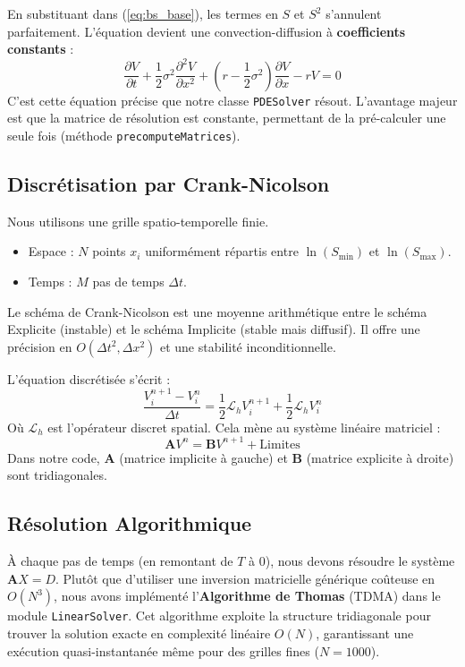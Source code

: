 \documentclass[a4paper,12pt]{article}
\begin{document}
En substituant dans (\ref{eq:bs_base}), les termes en $S$ et $S^2$ s'annulent parfaitement. L'équation devient une convection-diffusion à \textbf{coefficients constants} :
\begin{equation}
    \frac{\partial V}{\partial t} + \frac{1}{2}\sigma^2 \frac{\partial^2 V}{\partial x^2} + \left(r - \frac{1}{2}\sigma^2\right) \frac{\partial V}{\partial x} - rV = 0
    \label{eq:bs_log}
\end{equation}
C'est cette équation précise que notre classe \texttt{PDESolver} résout. L'avantage majeur est que la matrice de résolution est constante, permettant de la pré-calculer une seule fois (méthode \texttt{precomputeMatrices}).

\subsection{Discrétisation par Crank-Nicolson}
Nous utilisons une grille spatio-temporelle finie.
\begin{itemize}
    \item Espace : $N$ points $x_i$ uniformément répartis entre $\ln(S_{\min})$ et $\ln(S_{\max})$.
    \item Temps : $M$ pas de temps $\Delta t$.
\end{itemize}

Le schéma de Crank-Nicolson est une moyenne arithmétique entre le schéma Explicite (instable) et le schéma Implicite (stable mais diffusif). Il offre une précision en $O(\Delta t^2, \Delta x^2)$ et une stabilité inconditionnelle.

L'équation discrétisée s'écrit :
\begin{equation}
    \frac{V_i^{n+1} - V_i^n}{\Delta t} = \frac{1}{2} \mathcal{L}_h V_i^{n+1} + \frac{1}{2} \mathcal{L}_h V_i^n
\end{equation}
Où $\mathcal{L}_h$ est l'opérateur discret spatial. Cela mène au système linéaire matriciel :
\begin{equation}
    \mathbf{A} V^n = \mathbf{B} V^{n+1} + \text{Limites}
\end{equation}
Dans notre code, $\mathbf{A}$ (matrice implicite à gauche) et $\mathbf{B}$ (matrice explicite à droite) sont tridiagonales.

\subsection{Résolution Algorithmique}
À chaque pas de temps (en remontant de $T$ à $0$), nous devons résoudre le système $\mathbf{A} X = D$.
Plutôt que d'utiliser une inversion matricielle générique coûteuse en $O(N^3)$, nous avons implémenté l'\textbf{Algorithme de Thomas} (TDMA) dans le module \texttt{LinearSolver}.
Cet algorithme exploite la structure tridiagonale pour trouver la solution exacte en complexité linéaire $O(N)$, garantissant une exécution quasi-instantanée même pour des grilles fines ($N=1000$).
\end{document}
